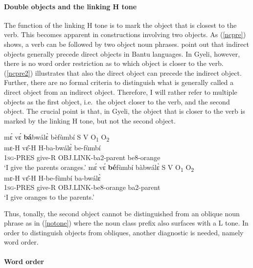\paragraph{Double objects and the linking H tone}
The function of the linking H tone is to mark the object that is closest to the verb. This becomes apparent in constructions involving two objects. As (\ref{ncpre}) shows, a verb can be followed by two object noun phrases. \citet[279]{riedel2012} point out that indirect objects generally precede direct objects in Bantu languages. In Gyeli, however, there is no word order restriction as to which object is closer to the verb.  (\ref{ncpre2}) illustrates that also the direct object can precede the indirect object. Further, there are no formal criteria to distinguish what is generally called a direct object from an indirect object. Therefore, I will rather refer to multiple objects as the first object, i.e.\ the object closer to the verb, and the second object. The crucial point is that, in Gyeli, the object that is closer to the verb is marked by the linking H tone, but not the second object.  

\begin{exe}
\ex\label{ncpre}
\begin{xlist}
\ex\label{ncpre1}
  \glll  mɛ́ vɛ́ {\bfseries bá}bwálɛ̀ bèfùmbí \hfill S V O\textsubscript{1} O\textsubscript{2}  \\
        mɛ-H vɛ̂-H H-ba-bwálɛ̀ be-fùmbí \\
           1\textsc{sg}-PRES give-R OBJ.LINK-ba2-parent be8-orange  \\
    \trans `I give the parents oranges.'
\ex \label{ncpre2}
  \glll  mɛ́ vɛ́ {\bfseries bé}fùmbí bàbwálɛ̀ \hfill S V O\textsubscript{1} O\textsubscript{2}  \\
       mɛ-H vɛ̂-H H-be-fùmbí ba-bwálɛ̀ \\
         1\textsc{sg}-PRES give-R OBJ.LINK-be8-orange ba2-parent   \\
    \trans `I give oranges to the parents.'
\end{xlist}
\end{exe} 

\noindent Thus, tonally, the second object cannot be distinguished from an oblique noun phrase as in (\ref{notone}) where the noun class prefix also surfaces with a L tone. In order to distinguish objects from obliques, another diagnostic is needed, namely word order.


\paragraph{Word order}

